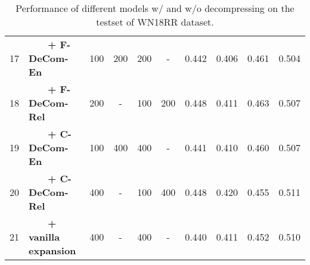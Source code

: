 \documentclass[letterpaper]{article} \usepackage{aaai20}  \usepackage{times}  \usepackage{helvet} \usepackage{courier}  \usepackage{booktabs}
\begin{document}
\begin{table*}[t]
\begin{tabular}{|c|l|cccc|cccc|}
         17 &~~~~\textbf{+ F-DeCom-En} & 100 & 200 & 200 & - & 0.442 & 0.406 & 0.461 & 0.504\\
         18 &~~~~\textbf{+ F-DeCom-Rel} & 200 & - & 100 & 200 & 0.448 & 0.411 & 0.463 & 0.507\\
         19 &~~~~\textbf{+ C-DeCom-En} & 100 & 400 & 400 & - & 0.441 & 0.410 & 0.460 & 0.507\\
         20 &~~~~\textbf{+ C-DeCom-Rel} & 400 & - & 100 & 400 & 0.448 & 0.420 & 0.455 & 0.511\\
         21 &~~~~\textbf{+ vanilla expansion} & 400 & - & 400 & - & 0.440 & 0.411 & 0.452 & 0.510\\
        \bottomrule 
    \end{tabular}
    \caption{Performance of different models w/ and w/o decompressing on the testset of WN18RR dataset. 
    }
    \label{tab:main_wn18rr}
    \vspace{-3mm}
\end{table*}
\end{document}
